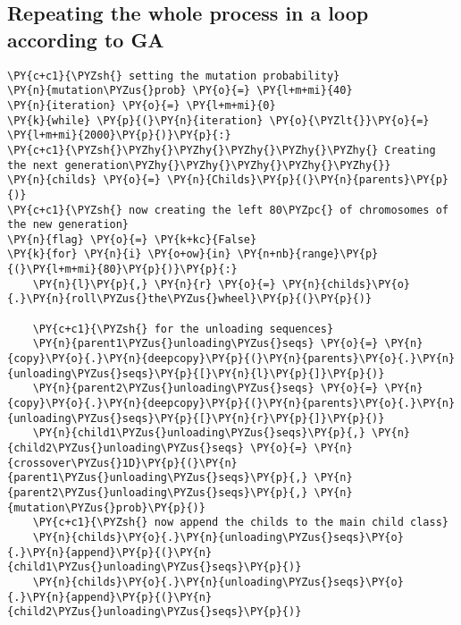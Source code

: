 \subsection*{Repeating the whole process in a loop according to
GA}\label{repeating-the-whole-process-in-a-loop-according-to-ga}

\begin{tcolorbox}[breakable, size=fbox, boxrule=1pt, pad at break*=1mm,colback=cellbackground, colframe=cellborder]
\begin{Verbatim}[commandchars=\\\{\}]
\PY{c+c1}{\PYZsh{} setting the mutation probability}
\PY{n}{mutation\PYZus{}prob} \PY{o}{=} \PY{l+m+mi}{40}
\PY{n}{iteration} \PY{o}{=} \PY{l+m+mi}{0}
\PY{k}{while} \PY{p}{(}\PY{n}{iteration} \PY{o}{\PYZlt{}}\PY{o}{=} \PY{l+m+mi}{2000}\PY{p}{)}\PY{p}{:}
\PY{c+c1}{\PYZsh{}\PYZhy{}\PYZhy{}\PYZhy{}\PYZhy{}\PYZhy{} Creating the next generation\PYZhy{}\PYZhy{}\PYZhy{}\PYZhy{}\PYZhy{}}
\PY{n}{childs} \PY{o}{=} \PY{n}{Childs}\PY{p}{(}\PY{n}{parents}\PY{p}{)}
\PY{c+c1}{\PYZsh{} now creating the left 80\PYZpc{} of chromosomes of the new generation}
\PY{n}{flag} \PY{o}{=} \PY{k+kc}{False}
\PY{k}{for} \PY{n}{i} \PY{o+ow}{in} \PY{n+nb}{range}\PY{p}{(}\PY{l+m+mi}{80}\PY{p}{)}\PY{p}{:}
    \PY{n}{l}\PY{p}{,} \PY{n}{r} \PY{o}{=} \PY{n}{childs}\PY{o}{.}\PY{n}{roll\PYZus{}the\PYZus{}wheel}\PY{p}{(}\PY{p}{)}

    \PY{c+c1}{\PYZsh{} for the unloading sequences}
    \PY{n}{parent1\PYZus{}unloading\PYZus{}seqs} \PY{o}{=} \PY{n}{copy}\PY{o}{.}\PY{n}{deepcopy}\PY{p}{(}\PY{n}{parents}\PY{o}{.}\PY{n}{unloading\PYZus{}seqs}\PY{p}{[}\PY{n}{l}\PY{p}{]}\PY{p}{)}
    \PY{n}{parent2\PYZus{}unloading\PYZus{}seqs} \PY{o}{=} \PY{n}{copy}\PY{o}{.}\PY{n}{deepcopy}\PY{p}{(}\PY{n}{parents}\PY{o}{.}\PY{n}{unloading\PYZus{}seqs}\PY{p}{[}\PY{n}{r}\PY{p}{]}\PY{p}{)}
    \PY{n}{child1\PYZus{}unloading\PYZus{}seqs}\PY{p}{,} \PY{n}{child2\PYZus{}unloading\PYZus{}seqs} \PY{o}{=} \PY{n}{crossover\PYZus{}1D}\PY{p}{(}\PY{n}{parent1\PYZus{}unloading\PYZus{}seqs}\PY{p}{,} \PY{n}{parent2\PYZus{}unloading\PYZus{}seqs}\PY{p}{,} \PY{n}{mutation\PYZus{}prob}\PY{p}{)}
    \PY{c+c1}{\PYZsh{} now append the childs to the main child class}
    \PY{n}{childs}\PY{o}{.}\PY{n}{unloading\PYZus{}seqs}\PY{o}{.}\PY{n}{append}\PY{p}{(}\PY{n}{child1\PYZus{}unloading\PYZus{}seqs}\PY{p}{)}
    \PY{n}{childs}\PY{o}{.}\PY{n}{unloading\PYZus{}seqs}\PY{o}{.}\PY{n}{append}\PY{p}{(}\PY{n}{child2\PYZus{}unloading\PYZus{}seqs}\PY{p}{)}


\end{Verbatim}
\end{tcolorbox}
